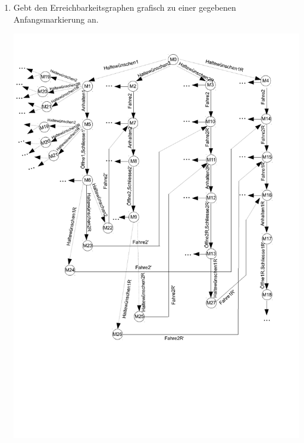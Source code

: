 \documentclass{scrreprt}
\begin{document}
\begin{enumerate}
$M_3 \xrightarrow{Anhalten_{2R}} M_4$

\begin{addmargin}[1cm]{0cm}
  $M_4(Stock_3) = M_3(Stock_3) - W(Stock_3, Anhalten_{2R}) + W(Anhalten_{2R}, Stock_3) = 1 - 1 + 0 = 0$

  $M_4(GlobalerHaltewunsch) = M_3(GlobalerHaltewunsch) - \\ W(GlobalerHaltewunsch, Anhalten_{2R}) + \\ W(Anhalten_{2R}, GlobalerHaltewunsch) = 1 - 1 + 0 = 0$

  $M_4(Haltewunsch_{2R}) = M_3(Haltewunsch_{2R}) - \\ W(Haltewunsch_{2R}, Anhalten_{2R}) + \\ W(Anhalten_{2R}, Haltewunsch_{2R}) = 1 - 1 + 0 = 0$

  $M_4(H"alt_{2R}) = M_3(H"alt_{2R}) - \\ W(H"alt_{2R}, Anhalten_{2R}) + W(Anhalten_{2R}, H"alt_{2R}) = 0 - 0 + 1 = 1$

  $\implies$ 
  $M_4 = (
  0, 0, 0, 0, 0, 
  0, 1, 0, 0, 0, 
  0, 1, 0, 0, 0, 
  0, 0, 0, 1, 0, 
  0, 1, 0, 0, 0
  )$
\end{addmargin}

Der Aufzug ist nun auf dem 3. Stock und hat angehalten.

\item Gebt den Erreichbarkeitsgraphen grafisch zu einer gegebenen Anfangsmarkierung an.

\includegraphics[width=1\textwidth]{eg.pdf}


\end{enumerate}
\end{document}
